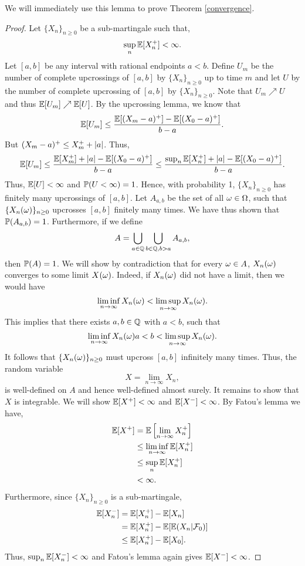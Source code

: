  We will immediately use this lemma to prove Theorem \eqref{convergence}.
 \begin{proof}
     Let $\{X_n\}_{n \ge 0}$ be a sub-martingale such that,
     \[\sup_n {\mathbb{E}}[X_n^+]< \infty. \]
     Let $[a,b]$ be any interval with rational endpoints $a<b$. Define $U_m$ be the number of complete upcrossings of $[a,b]$ by $\{X_n\}_{n \ge 0}$ up to time $m$ and let $U$ by the number of complete upcrossing of $[a,b]$ by $\{X_n\}_{n \ge 0}$. Note that $U_m \nearrow U$ and thus ${\mathbb{E}}[U_m] \nearrow {\mathbb{E}}[U]$. By the upcrossing lemma, we know that
     \[{\mathbb{E}}[U_m] \le \frac{{\mathbb{E}}[(X_m-a)^+]-{\mathbb{E}}[(X_0-a)^+]}{b-a}. \]
     But $(X_m-a)^+ \le X_m^++{\left\lvert a\right\rvert}$. Thus, 
     \[{\mathbb{E}}[U_m] \le \frac{{\mathbb{E}}[X_m^+]+{\left\lvert a\right\rvert}-{\mathbb{E}}[(X_0-a)^+]}{b-a} \le \frac{\sup_n {\mathbb{E}}[X_n^+]+{\left\lvert a\right\rvert}-{\mathbb{E}}[(X_0-a)^+]}{b-a}. \]
     Thus, ${\mathbb{E}}[U] < \infty$ and ${\mathbb{P}}(U < \infty) = 1$. Hence, with probability 1, $\{X_n\}_{n \ge 0}$ has finitely many upcrossings of $[a,b]$. Let $A_{a,b}$ be the set of all ${\omega} \in {{\Omega}}$, such that $\{X_n({\omega})\}_{n \ge 0}$ upcrosses $[a,b]$ finitely many times. We have thus shown that ${\mathbb{P}}(A_{a,b}) = 1$. Furthermore, if we define
     \[A = \bigcup_{a \in {\mathbb{Q}}} \bigcup_{b \in {\mathbb{Q}}, b>a}A_{a,b}, \]
     then ${\mathbb{P}}(A)=1$. We will show by contradiction that for every ${\omega} \in A$, $X_n({\omega})$ converges to some limit $X({\omega})$. Indeed, if $X_n({\omega})$ did not have a limit, then we would have
     \[ \liminf_{n \to \infty}X_n({\omega}) < \limsup_{n \to \infty}X_n({\omega}).\]
     This implies that there exists $a,b \in {\mathbb{Q}}$ with $a<b$, such that 
     \[\liminf_{n \to \infty}X_n({\omega}) a<b< \limsup_{n \to \infty}X_n({\omega}). \]
     It follows that $\{X_n({\omega})\}_{n \ge 0}$ must upcross $[a,b]$ infinitely many times. Thus, the random variable
     \[X = \lim_{n \to \infty} X_n,\]
     is well-defined on $A$ and hence well-defined almost surely. It remains to show that $X$ is integrable. We will show ${\mathbb{E}}[X^+] < \infty$ and ${\mathbb{E}}[X^-] < \infty$. By Fatou's lemma we have,
     \begin{align*}
         {\mathbb{E}}[X^+] &= {\mathbb{E}}\left[\lim_{n \to \infty} X_n^+\right]\\
         &\le \liminf_{n \to \infty} {\mathbb{E}}[X_n^+]\\
         &\le \sup_n {\mathbb{E}}[X_n^+]\\
         &< \infty.
     \end{align*}
     Furthermore, since $\{X_n\}_{n \ge 0}$ is a sub-martingale,
     \begin{align*}
         {\mathbb{E}}[X_n^-]&={\mathbb{E}}[X_n^+]-{\mathbb{E}}[X_n]\\
         &={\mathbb{E}}[X_n^+]-{\mathbb{E}}[{\mathbb{E}}(X_n|{\mathcal{F}}_0)]\\
         &\le {\mathbb{E}}[X_n^+]-{\mathbb{E}}[X_0].
     \end{align*} 
     Thus, $\sup_{n} {\mathbb{E}}[X_n^-]<\infty$ and Fatou's lemma again gives ${\mathbb{E}}[X^-]<\infty$.
 \end{proof}
